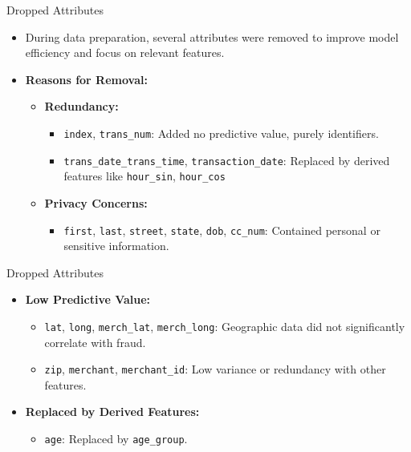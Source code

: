 \documentclass{beamer}
\begin{document}
\begin{frame}{Dropped Attributes}
    \begin{itemize}
        \item During data preparation, several attributes were removed to improve model efficiency and focus on relevant features.
        \item \textbf{Reasons for Removal:}
        \begin{itemize}
            \item \textbf{Redundancy:}
            \begin{itemize}
                \item \texttt{index}, \texttt{trans\_num}: Added no predictive value, purely identifiers.
                \item \texttt{trans\_date\_trans\_time}, \texttt{transaction\_date}: Replaced by derived features like \texttt{hour\_sin}, \texttt{hour\_cos}
            \end{itemize}
            \item \textbf{Privacy Concerns:}
            \begin{itemize}
                \item \texttt{first}, \texttt{last}, \texttt{street}, \texttt{state}, \texttt{dob}, \texttt{cc\_num}: Contained personal or sensitive information.
            \end{itemize}
        \end{itemize}
    \end{itemize}
\end{frame}

\begin{frame}{Dropped Attributes}
    \begin{itemize}
        \item \textbf{Low Predictive Value:}
        \begin{itemize}
            \item \texttt{lat}, \texttt{long}, \texttt{merch\_lat}, \texttt{merch\_long}: Geographic data did not significantly correlate with fraud.
            \item \texttt{zip}, \texttt{merchant}, \texttt{merchant\_id}: Low variance or redundancy with other features.
        \end{itemize}
        \item \textbf{Replaced by Derived Features:}
        \begin{itemize}
            \item \texttt{age}: Replaced by \texttt{age\_group}.
    \end{itemize}
    \end{itemize}
\end{frame}
\end{document}
